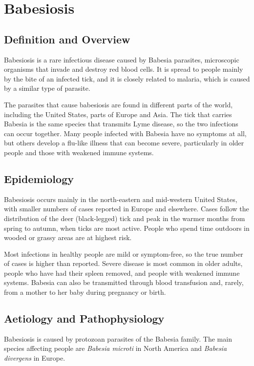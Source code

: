 \chapter{Babesiosis}

\section*{Definition and Overview}
Babesiosis is a rare infectious disease caused by Babesia parasites, microscopic organisms that invade and destroy red blood cells. It is spread to people mainly by the bite of an infected tick, and it is closely related to malaria, which is caused by a similar type of parasite.

The parasites that cause babesiosis are found in different parts of the world, including the United States, parts of Europe and Asia. The tick that carries Babesia is the same species that transmits Lyme disease, so the two infections can occur together. Many people infected with Babesia have no symptoms at all, but others develop a flu-like illness that can become severe, particularly in older people and those with weakened immune systems.

\section*{Epidemiology}
Babesiosis occurs mainly in the north-eastern and mid-western United States, with smaller numbers of cases reported in Europe and elsewhere. Cases follow the distribution of the deer (black-legged) tick and peak in the warmer months from spring to autumn, when ticks are most active. People who spend time outdoors in wooded or grassy areas are at highest risk.

Most infections in healthy people are mild or symptom-free, so the true number of cases is higher than reported. Severe disease is most common in older adults, people who have had their spleen removed, and people with weakened immune systems. Babesia can also be transmitted through blood transfusion and, rarely, from a mother to her baby during pregnancy or birth.

\section*{Aetiology and Pathophysiology}
Babesiosis is caused by protozoan parasites of the Babesia family. The main species affecting people are \textit{Babesia microti} in North America and \textit{Babesia divergens} in Europe.

